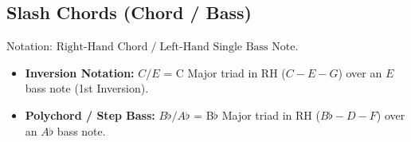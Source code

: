 \subsection{Slash Chords (Chord / Bass)}

Notation: $\text{Right-Hand Chord} \;/\; \text{Left-Hand Single Bass Note}$.
\begin{itemize}
    \item \textbf{Inversion Notation:} $C / E$ = C Major triad in RH ($C - E - G$) over an $E$ bass note (1st Inversion).
    \item \textbf{Polychord / Step Bass:} $B\flat / A\flat$ = B$\flat$ Major triad in RH ($B\flat - D - F$) over an $A\flat$ bass note.
\end{itemize}

